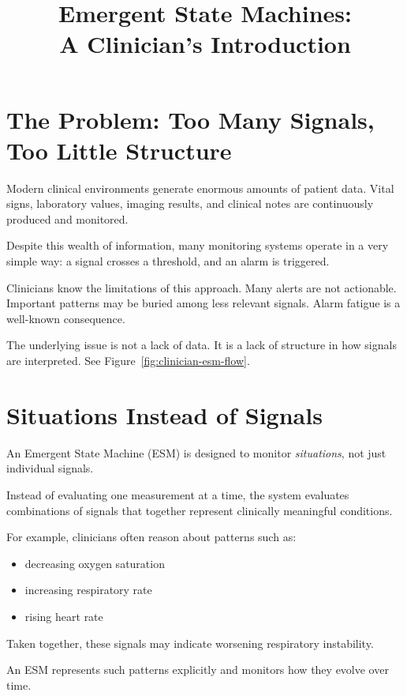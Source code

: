 \documentclass[11pt]{article}
\title{Emergent State Machines:\\A Clinician's Introduction}
\author{}
\date{}
\begin{document}
\maketitle

\section{The Problem: Too Many Signals, Too Little Structure}

Modern clinical environments generate enormous amounts of patient data. Vital signs, laboratory values, imaging results, and clinical notes are continuously produced and monitored.

Despite this wealth of information, many monitoring systems operate in a very simple way: a signal crosses a threshold, and an alarm is triggered.

Clinicians know the limitations of this approach. Many alerts are not actionable. Important patterns may be buried among less relevant signals. Alarm fatigue is a well-known consequence.

The underlying issue is not a lack of data. It is a lack of structure in how signals are interpreted. See Figure~\ref{fig:clinician-esm-flow}.



\section{Situations Instead of Signals}

An Emergent State Machine (ESM) is designed to monitor \textit{situations}, not just individual signals.

Instead of evaluating one measurement at a time, the system evaluates combinations of signals that together represent clinically meaningful conditions.

For example, clinicians often reason about patterns such as:

\begin{itemize}
\item decreasing oxygen saturation
\item increasing respiratory rate
\item rising heart rate
\end{itemize}

Taken together, these signals may indicate worsening respiratory instability.

An ESM represents such patterns explicitly and monitors how they evolve over time.
\end{document}
